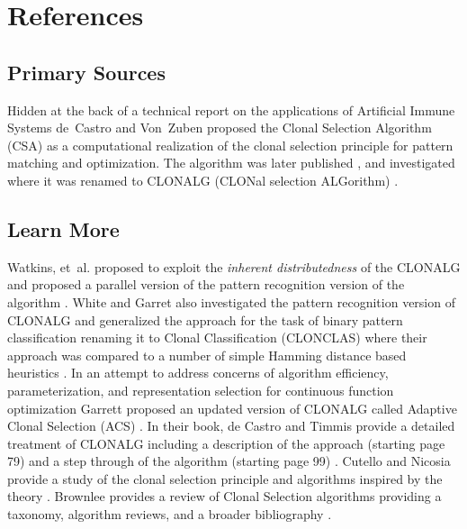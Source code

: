 \documentclass[a4paper, 11pt]{article}
\begin{document}



\section{References}
\label{sec:references}

% 
% 
\subsection{Primary Sources}
Hidden at the back of a technical report on the applications of Artificial Immune Systems de~Castro and Von~Zuben \cite{Castro1999} proposed the Clonal Selection Algorithm (CSA) as a computational realization of the clonal selection principle for pattern matching and optimization.
The algorithm was later published \cite{Castro2000}, and investigated where it was renamed to CLONALG (CLONal selection ALGorithm) \cite{Castro2002a}.

% 
% 
\subsection{Learn More}
Watkins, et~al. proposed to exploit the \emph{inherent distributedness} of the CLONALG and proposed a parallel version of the pattern recognition version of the algorithm \cite{Watkins2003}.
White and Garret also investigated the pattern recognition version of CLONALG and generalized the approach for the task of binary pattern classification renaming it to Clonal Classification (CLONCLAS) where their approach was compared to a number of simple Hamming distance based heuristics \cite{White2003}.
In an attempt to address concerns of algorithm efficiency, parameterization, and representation selection for continuous function optimization Garrett proposed an updated version of CLONALG called Adaptive Clonal Selection (ACS) \cite{Garrett2004}.
In their book, de Castro and Timmis provide a detailed treatment of CLONALG including a description of the approach (starting page 79) and a step through of the algorithm (starting page 99) \cite{Castro2002b}.
Cutello and Nicosia provide a study of the clonal selection principle and algorithms inspired by the theory \cite{Cutello2005}.
Brownlee provides a review of Clonal Selection algorithms providing a taxonomy, algorithm reviews, and a broader bibliography \cite{Brownlee2007b}. 
\end{document}
